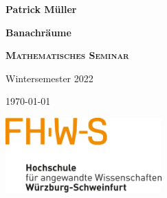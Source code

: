 \documentclass[10pt,a4paper]{article}
\theoremstyle{plain}
\theoremstyle{definition}
\theoremstyle{nonumberplain}
\begin{document}
\renewcommand{\figurename}{Abb.}
\begin{titlepage}
	\centering
	{\Large\bfseries Patrick Müller \par}
	\vspace{5cm}
	{\huge\bfseries Banachräume\par}
	\vspace{1cm}
	{\scshape\Large\bfseries Mathematisches Seminar\par}
	\vspace{1cm}
	{\Large Wintersemester 2022\par}
	\vspace{2cm}
	\large\today
	\vspace{7cm}

	\vfill
    \includegraphics[width=0.45\textwidth]{pictures/thws.png}\par\vspace{1cm}
	\vfill
\end{titlepage}


\renewcommand*\contentsname{Inhalt}
\tableofcontents{}
\newpage
\pagestyle{fancy}
\end{document}
